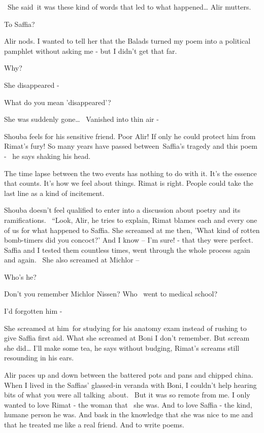 \documentclass[12pt]{book}
\begin{document}
~{\textquotedbl}She said~it was these kind of words that led to what happened{\dots}{\textquotedbl} Alir mutters.

{\textquotedbl}To Saffia?{\textquotedbl}

Alir nods. {\textquotedbl}I wanted to tell her that the Balads turned my poem into a political pamphlet without asking
me - but I didn't get that far.{\textquotedbl}

{\textquotedbl}Why?{\textquotedbl}

{\textquotedbl}She disappeared -{\textquotedbl}

{\textquotedbl}What do you mean 'disappeared'?{\textquotedbl}

{\textquotedbl}She was suddenly gone{\dots} \ Vanished into thin air -{\textquotedbl}

Shouba feels for his sensitive friend. Poor Alir! If only he could protect him from Rimat's fury! {\textquotedbl}So many
years have passed between~Saffia's tragedy and this poem -{\textquotedbl} \ he says shaking his head.

{\textquotedbl}The time lapse between the two events has nothing to do with it. It's the essence that counts. It's how
we feel about things. Rimat is right. People could take the last line as a kind of incitement.{\textquotedbl}

Shouba doesn't feel qualified to enter into a discussion about poetry and its{ }ramifications.
\ {}``Look, Alir,{\textquotedbl} he tries to explain, {\textquotedbl}Rimat blames each and every one of us for what
happened to Saffia. She screamed at me then, 'What kind of rotten bomb-timers did you concoct?' And I know -- I'm sure!
- that they were perfect. Saffia and I tested them countless times, went through the whole process again and again.
~She also screamed at Michlor --{\textquotedbl}

{\textquotedbl}Who's he?{\textquotedbl}

{\textquotedbl}Don't you remember Michlor Nissen? Who \ went to medical school?{\textquotedbl}

{\textquotedbl}I'd forgotten him -{\textquotedbl}

{\textquotedbl}She screamed at him~for studying for his anatomy exam instead of rushing to give Saffia first aid. What
she screamed at Boni I don't remember. But scream she did{\dots} I'll make some tea,{\textquotedbl} he says without
budging, Rimat's screams still resounding in his ears.

Alir paces up and down between the battered pots and pans and chipped china. {\textquotedbl}When I lived in the Saffias'
glassed-in veranda with Boni, I couldn't help hearing bits of what you were all talking~about.~ But it was so remote
from me. I only wanted to love Rimat - the woman that \ she was. And to love Saffia - the kind, humane person he was.
And bask in the knowledge that she was nice to me and that he treated me like a real friend. And to write
poems.{\textquotedbl}
\end{document}
